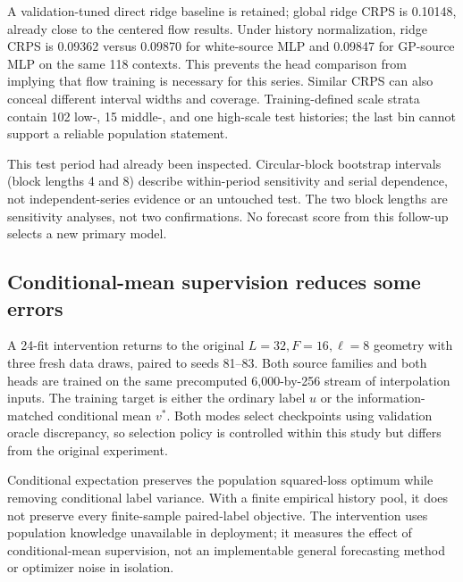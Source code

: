 \documentclass[10pt,twocolumn]{article}
\begin{document}
A validation-tuned direct ridge baseline is retained; global ridge CRPS is 0.10148, already close to the centered flow results. Under history normalization, ridge CRPS is 0.09362 versus 0.09870 for white-source MLP and 0.09847 for GP-source MLP on the same 118 contexts. This prevents the head comparison from implying that flow training is necessary for this series. Similar CRPS can also conceal different interval widths and coverage. Training-defined scale strata contain 102 low-, 15 middle-, and one high-scale test histories; the last bin cannot support a reliable population statement.

This test period had already been inspected. Circular-block bootstrap intervals (block lengths 4 and 8) describe within-period sensitivity and serial dependence, not independent-series evidence or an untouched test. The two block lengths are sensitivity analyses, not two confirmations. No forecast score from this follow-up selects a new primary model.

\subsection{Conditional-mean supervision reduces some errors}
A 24-fit intervention returns to the original $L=32,F=16,\ell=8$ geometry with three fresh data draws, paired to seeds 81--83. Both source families and both heads are trained on the same precomputed 6,000-by-256 stream of interpolation inputs. The training target is either the ordinary label $u$ or the information-matched conditional mean $v^*$. Both modes select checkpoints using validation oracle discrepancy, so selection policy is controlled within this study but differs from the original experiment.

Conditional expectation preserves the population squared-loss optimum while removing conditional label variance. With a finite empirical history pool, it does not preserve every finite-sample paired-label objective. The intervention uses population knowledge unavailable in deployment; it measures the effect of conditional-mean supervision, not an implementable general forecasting method or optimizer noise in isolation.
\begin{table}[h]
\centering\footnotesize
\caption{Means over three fresh paired draws. S: stochastic labels; C: conditional-mean labels. Gap is residual velocity discrepancy from the information-matched field, distinct from label MSE.}\label{tab:label}
\end{table}
\end{document}
